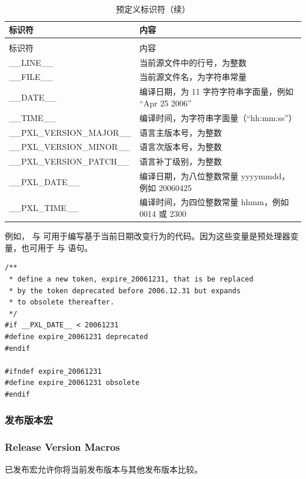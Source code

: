 \begin{longtable}{@{}>{\raggedright\arraybackslash\ttfamily}p{} p{}@{}}
\caption{预定义标识符}\label{tab:pxl-predef-id}\\
\toprule
标识符 & 内容 \\
\midrule
\endfirsthead
\caption[]{预定义标识符（续）}\\
\toprule
标识符 & 内容 \\
\midrule
\endhead
\bottomrule
\endfoot
\_\_LINE\_\_ & 当前源文件中的行号，为整数 \\
\_\_FILE\_\_ & 当前源文件名，为字符串常量 \\
\_\_DATE\_\_ & 编译日期，为 11 字符字符串字面量，例如 ``Apr 25 2006'' \\
\_\_TIME\_\_ & 编译时间，为字符串字面量（``hh:mm:ss''） \\
\_\_PXL\_VERSION\_MAJOR\_\_ & 语言主版本号，为整数 \\
\_\_PXL\_VERSION\_MINOR\_\_ & 语言次版本号，为整数 \\
\_\_PXL\_VERSION\_PATCH\_\_ & 语言补丁级别，为整数 \\
\_\_PXL\_DATE\_\_ & 编译日期，为八位整数常量 yyyymmdd，例如 20060425 \\
\_\_PXL\_TIME\_\_ & 编译时间，为四位整数常量 hhmm，例如 0014 或 2300 \\
\end{longtable}

例如， 与  可用于编写基于当前日期改变行为的代码。因为这些变量是预处理器变量，也可用于  与  语句。
\begin{lstlisting}[style=pxl]
/**
 * define a new token, expire_20061231, that is be replaced
 * by the token deprecated before 2006.12.31 but expands
 * to obsolete thereafter.
 */
#if __PXL_DATE__ < 20061231
#define expire_20061231 deprecated
#endif

#ifndef expire_20061231
#define expire_20061231 obsolete
#endif
\end{lstlisting}

\subsubsection{发布版本宏}
\subsubsection*{Release Version Macros}

已发布宏允许你将当前发布版本与其他发布版本比较。

